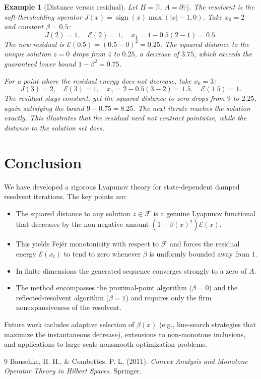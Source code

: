 \documentclass{article}
\newtheorem{example}{Example}
\begin{document}
\begin{example}[Distance versus residual]
Let \(H = \mathbb{R}\), \(A = \partial|\cdot|\). The resolvent is the soft-thresholding operator \(J(x) = \operatorname{sign}(x) \max(|x|-1,0)\). Take \(x_0 = 2\) and constant \(\beta = 0.5\):
\[
J(2) = 1,\quad \mathcal{E}(2) = 1,\quad x_1 = 1 - 0.5(2-1) = 0.5.
\]
The new residual is \(\mathcal{E}(0.5) = (0.5-0)^2 = 0.25\). The squared distance to the unique solution \(z=0\) drops from \(4\) to \(0.25\), a decrease of \(3.75\), which exceeds the guaranteed lower bound \(1 - \beta^2 = 0.75\).

For a point where the residual energy does not decrease, take \(x_0 = 3\):
\[
J(3) = 2,\quad \mathcal{E}(3) = 1,\quad x_1 = 2 - 0.5(3-2) = 1.5,\quad \mathcal{E}(1.5) = 1.
\]
The residual stays constant, yet the squared distance to zero drops from \(9\) to \(2.25\), again satisfying the bound \(9 - 0.75 = 8.25\). The next iterate reaches the solution exactly. This illustrates that the residual need not contract pointwise, while the distance to the solution set does.
\end{example}

\section{Conclusion}

We have developed a rigorous Lyapunov theory for state-dependent damped resolvent iterations. The key points are:

\begin{itemize}
\item The squared distance to any solution \(z \in \mathcal{F}\) is a genuine Lyapunov functional that decreases by the non-negative amount \((1 - \beta(x)^2) \mathcal{E}(x)\).
\item This yields Fejér monotonicity with respect to \(\mathcal{F}\) and forces the residual energy \(\mathcal{E}(x_t)\) to tend to zero whenever \(\beta\) is uniformly bounded away from \(1\).
\item In finite dimensions the generated sequence converges strongly to a zero of \(A\).
\item The method encompasses the proximal-point algorithm (\(\beta=0\)) and the reflected-resolvent algorithm (\(\beta=1\)) and requires only the firm nonexpansiveness of the resolvent.
\end{itemize}

Future work includes adaptive selection of \(\beta(x)\) (e.g., line-search strategies that maximize the instantaneous decrease), extensions to non-monotone inclusions, and applications to large-scale nonsmooth optimization problems.

\begin{thebibliography}{9}
 Bauschke, H. H., \& Combettes, P. L. (2011). \emph{Convex Analysis and Monotone Operator Theory in Hilbert Spaces}. Springer.
\end{thebibliography}
\end{document}
